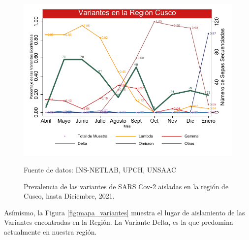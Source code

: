 \documentclass[12pt,a4paper,openany]{book}
\begin{document}
			
		\begin{figure}[h]
			\caption{Prevalencia de las variantes de SARS Cov-2 aisladas en la región de Cusco, hasta Diciembre, 2021. }\label{fig:variantes}
			\begin{center}
				\includegraphics[width=0.85\linewidth]{../figuras/variantes.pdf}
			\end{center}
			{\footnotesize {Fuente de datos: INS-NETLAB, UPCH, UNSAAC}}
		\end{figure}
	
	
	Asímismo, la Figura \ref{fig:mapa_variantes}  muestra el lugar de aislamiento de las Variantes encontradas en la Región. La  Variante Delta, es la que predomina actualmente en nuestra región.
	
	
  
\end{document}
